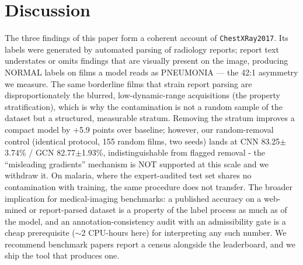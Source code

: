 \section{Discussion}
The three findings of this paper form a coherent account of
\texttt{ChestXRay2017}. Its labels were generated by automated parsing of
radiology reports; report text understates or omits findings that are
visually present on the image, producing NORMAL labels on films a model
reads as PNEUMONIA --- the 42:1 asymmetry we measure. The same borderline
films that strain report parsing are disproportionately the blurred,
low-dynamic-range acquisitions (the property stratification), which is
why the contamination is not a random sample of the dataset but a
structured, measurable stratum. Removing the stratum improves a compact model by +5.9 points over baseline; however, our random-removal control (identical protocol, 155 random films, two seeds) lands at CNN 83.25$\pm$3.74\% / GCN 82.77$\pm$1.93\%, indistinguishable from flagged removal - the ``misleading gradients'' mechanism is NOT supported at this scale and we withdraw it. On malaria, where the expert-audited test set shares no contamination with training, the same procedure does not transfer.
The broader implication for medical-imaging benchmarks: a published
accuracy on a web-mined or report-parsed dataset is a property of the
label process as much as of the model, and an annotation-consistency audit with an admissibility gate is a cheap prerequisite ($\sim$2 CPU-hours here) for
interpreting any such number. We recommend benchmark papers report a
census alongside the leaderboard, and we ship the tool that produces one.
